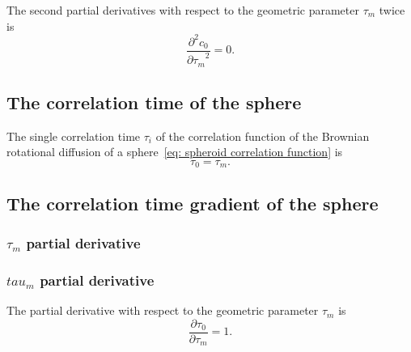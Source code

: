 The second partial derivatives with respect to the geometric parameter $\tau_m$ twice is
\begin{equation}
    \frac{\partial^2 c_{0}}{{\partial \tau_m}^2} = 0.
\end{equation}




\subsection{The correlation time of the sphere}

The single correlation time $\tau_i$ of the correlation function of the Brownian rotational diffusion of a sphere~\eqref{eq: spheroid correlation function} is
\begin{equation}
    \tau_{0} = \tau_m.
\end{equation}




\subsection{The correlation time gradient of the sphere}


\begin{latexonly}
    \subsubsection{$\tau_m$ partial derivative}
\end{latexonly}
\begin{htmlonly}
    \subsubsection{$tau_m$ partial derivative}
\end{htmlonly}

The partial derivative with respect to the geometric parameter $\tau_m$ is
\begin{equation}
    \frac{\partial \tau_{0}}{\partial \tau_m} = 1.
\end{equation}





